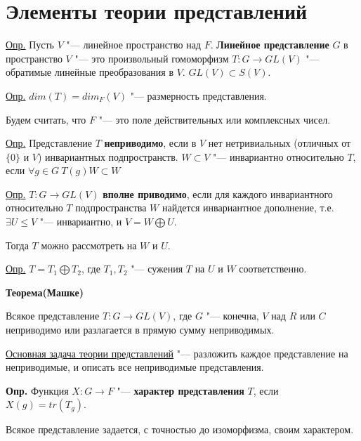\documentclass{article}
\begin{document}
\section{Элементы теории представлений}

\underline{Опр.} Пусть $V$ "--- линейное пространство над $F$. \textbf{Линейное представление} $G$ в пространство $V$ "--- это произвольный гомоморфизм $T : G \rightarrow GL(V)$ "--- обратимые линейные преобразования в $V$. $GL(V) \subset S(V)$.

\vspace{5pt}

\underline{Опр.} $dim(T) = dim_F(V)$ "--- размерность представления.

Будем считать, что $F$ "--- это поле действительных или комплексных чисел.

\underline{Опр.} Представление $T$ \textbf{неприводимо}, если в $V$ нет нетривиальных (отличных от $\{0\}$ и $V$) инвариантных подпространств. $W \subset V$ "--- инвариантно относительно $T$, если $\forall g \in G \  T(g)W \subset W$

\vspace{5pt}

\underline{Опр.} $T : G \rightarrow GL(V)$ \textbf{вполне приводимо}, если для каждого инвариантного относительно $T$ подпространства $W$ найдется инвариантное дополнение, т.е. $\exists U \leq V$ "--- инвариантно, и $V = W \bigoplus U$.

Тогда $T$ можно рассмотреть на  $W$ и $U$.

\vspace{5pt}

\underline{Опр.} $T = T_1 \bigoplus T_2$, где $T_1, T_2$ "--- сужения $T$ на $U$ и $W$ соответственно.

\vspace{10pt}

\textbf{Теорема(Машке)}

Всякое представление $T: G \rightarrow GL(V)$, где $G$ "--- конечна, $V$ над $R$ или $C$ неприводимо или разлагается в прямую сумму неприводимых.

\underline{Основная задача теории представлений} "--- разложить каждое представление на неприводимые, и описать все неприводимые представления.

\vspace{5pt}

\textbf{Опр.} Функция $X: G \rightarrow F$ "--- \textbf{характер представления} $T$, если $X(g) = tr(T_g)$.

Всякое представление задается, с точностью до изоморфизма, своим характером.
\end{document}
